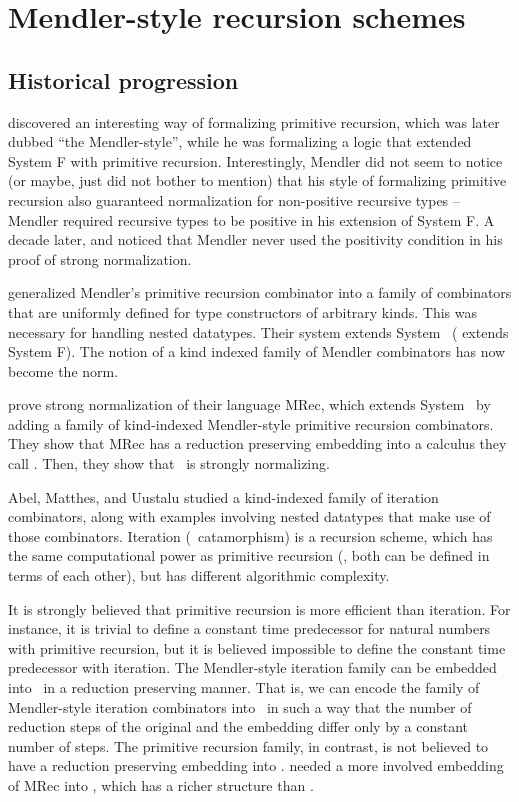 \chapter{Mendler-style recursion schemes}\label{ch:mendler}

\section{Historical progression}

\citet{Mendler87} discovered an interesting way of formalizing
primitive recursion, which was later dubbed ``the Mendler-style'',
while he was formalizing a logic that extended System \textsf{F} with
primitive recursion. Interestingly, Mendler did not seem to notice
(or maybe, just did not bother to mention) that his style of formalizing
primitive recursion also guaranteed normalization for non-positive recursive
types -- Mendler required recursive types to be positive in his extension of
System \textsf{F}. A decade later, \citet{matthes98phd} and \citet{uustalu98phd}
noticed that Mendler never used the positivity condition in his proof of
strong normalization.

\citet{AbeMat04} generalized Mendler's primitive recursion combinator
\cite{Mendler87} into a family of combinators that are uniformly defined for
type constructors of arbitrary kinds. This was necessary for
handling nested datatypes. Their system extends System \Fw\ 
(\citet{Mendler87} extends System \textsf{F}). The notion
of a kind indexed family of Mendler combinators has now become the norm.

\citet{AbeMat04} prove strong normalization of their language \textsf{MRec},
which extends System \Fw\ by adding a family of kind-indexed Mendler-style
primitive recursion combinators. They show that \textsf{MRec} has
a reduction preserving embedding into a calculus they call \Fixw.
Then, they show that \Fixw\ is strongly normalizing.

Abel, Matthes, and Uustalu \cite{AbeMatUus03,AbeMatUus05} studied
a kind-indexed family of iteration combinators, along with examples
involving nested datatypes that make use of those combinators.
Iteration (\aka\ catamorphism) is a recursion scheme, which has the same
computational power as primitive recursion (\ie, both can be defined
in terms of each other), but has different algorithmic complexity. 

It is strongly believed that primitive recursion is more efficient than
iteration. For instance, it is trivial to define a constant time predecessor
for natural numbers with primitive recursion, but it is believed impossible
to define the constant time predecessor with iteration. The Mendler-style
iteration family can be embedded into \Fw\ in a reduction preserving manner.
That is, we can encode the family of Mendler-style iteration combinators
into \Fw\ in such a way that the number of reduction steps of the original
and the embedding differ only by a constant number of steps. The primitive
recursion family, in contrast, is not believed to have a reduction preserving
embedding into \Fw. \citet{AbeMat04} needed a more involved embedding of
\textsf{MRec} into \Fixw, which has a richer structure than \Fw.

